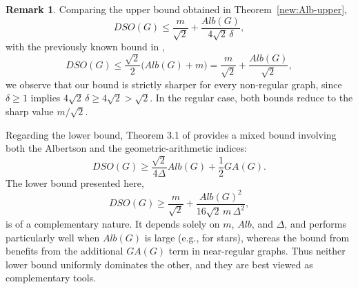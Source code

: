 \documentclass{article}
\theoremstyle{definition}
\newtheorem{remark}{Remark}
\begin{document}
\begin{remark}
Comparing the upper bound obtained in Theorem~\ref{new:Alb-upper},
\[
DSO(G) \le \frac{m}{\sqrt{2}} + \frac{Alb(G)}{4\sqrt{2}\,\delta},
\]
with the previously known bound in \cite{5},
\[
DSO(G) \le \frac{\sqrt{2}}{2}\bigl(Alb(G)+m\bigr)
= \frac{m}{\sqrt{2}} + \frac{Alb(G)}{\sqrt{2}},
\]
we observe that our bound is strictly sharper for every non-regular graph, since $\delta \ge 1$ implies $4\sqrt{2}\,\delta \ge 4\sqrt{2} > \sqrt{2}$. In the regular case, both bounds reduce to the sharp value $m/\sqrt{2}$.

Regarding the lower bound, Theorem 3.1 of \cite{5} provides a mixed bound involving both the Albertson and the geometric-arithmetic indices:
\[
DSO(G) \ge \frac{\sqrt{2}}{4\Delta}Alb(G) + \frac{1}{2}GA(G).
\]
The lower bound presented here,
\[
DSO(G) \ge \frac{m}{\sqrt{2}} + \frac{Alb(G)^2}{16\sqrt{2}\,m\,\Delta^2},
\]
is of a complementary nature. It depends solely on $m$, $Alb$, and $\Delta$, and performs particularly well when $Alb(G)$ is large (e.g., for stars), whereas the bound from \cite{5} benefits from the additional $GA(G)$ term in near-regular graphs. Thus neither lower bound uniformly dominates the other, and they are best viewed as complementary tools.
\end{remark}
\end{document}
